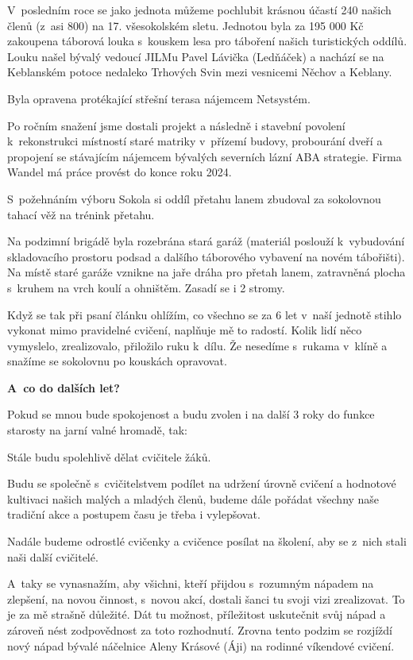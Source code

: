 \documentclass[11pt]{article}
\begin{document}
V~posledním roce se jako jednota můžeme pochlubit krásnou účastí 240 našich členů (z~asi 800) na 17. všesokolském sletu.
Jednotou byla za 195 000 Kč zakoupena táborová louka s~kouskem lesa pro táboření našich turistických oddílů. Louku našel bývalý vedoucí JILMu Pavel Lávička (Ledňáček) a nachází se na Keblanském potoce nedaleko Trhových Svin mezi vesnicemi Něchov a Keblany.

Byla opravena protékající střešní terasa nájemcem Netsystém.

Po ročním snažení jsme dostali projekt a následně i stavební povolení k~rekonstrukci místností staré matriky v~přízemí budovy, probourání dveří a propojení se stávajícím nájemcem bývalých severních lázní ABA strategie. Firma Wandel má práce provést do konce roku 2024.

S~požehnáním výboru Sokola si oddíl přetahu lanem zbudoval za sokolovnou tahací věž na trénink přetahu.

Na podzimní brigádě byla rozebrána stará garáž (materiál poslouží k~vybudování skladovacího prostoru podsad a dalšího táborového vybavení na novém tábořišti). Na místě staré garáže vznikne na jaře dráha pro přetah lanem, zatravněná plocha s~kruhem na vrch koulí a ohništěm. Zasadí se i 2 stromy.

Když se tak při psaní článku ohlížím, co všechno se za 6 let v~naší jednotě stihlo vykonat mimo pravidelné cvičení, naplňuje mě to radostí. Kolik lidí něco vymyslelo, zrealizovalo, přiložilo ruku k~dílu. Že nesedíme s~rukama v~klíně a snažíme se sokolovnu po kouskách opravovat.

\textbf{A~co do dalších let?}

Pokud se mnou bude spokojenost a budu zvolen i na další 3 roky do funkce starosty na jarní valné hromadě, tak:

Stále budu spolehlivě dělat cvičitele žáků.

Budu se společně s~cvičitelstvem podílet na udržení úrovně cvičení a hodnotové kultivaci našich malých a mladých členů, budeme dále pořádat všechny naše tradiční akce a postupem času je třeba i vylepšovat.

Nadále budeme odrostlé cvičenky a cvičence posílat na školení, aby se z~nich stali naši další cvičitelé.

A~taky se vynasnažím, aby všichni, kteří přijdou s~rozumným nápadem na zlepšení, na novou činnost, s~novou akcí, dostali šanci tu svoji vizi zrealizovat. To je za mě strašně důležité. Dát tu možnost, příležitost uskutečnit svůj nápad a zároveň nést zodpovědnost za toto rozhodnutí. Zrovna tento podzim se rozjíždí nový nápad bývalé náčelnice Aleny Krásové (Áji) na rodinné víkendové cvičení.
\end{document}
